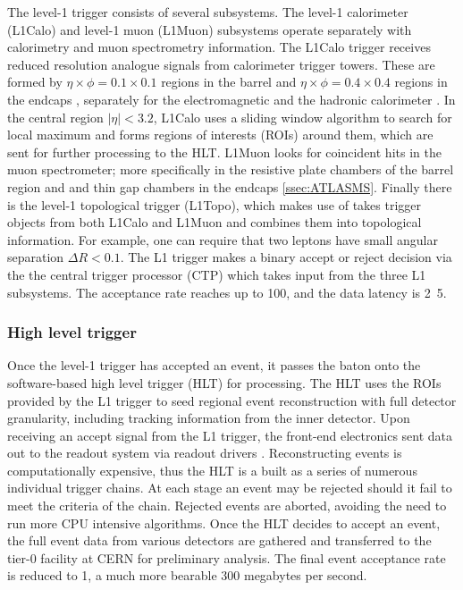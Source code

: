 The level-1 trigger consists of several subsystems. The level-1 calorimeter (L1Calo) and level-1 muon (L1Muon) subsystems operate separately with calorimetry and muon spectrometry information. The L1Calo trigger receives reduced resolution analogue signals from calorimeter trigger towers. These are formed by $\eta\times\phi=0.1\times0.1$ regions in the barrel and $\eta\times\phi=0.4\times0.4$ regions in the endcaps \cite{?}, separately for the electromagnetic and the hadronic calorimeter \cite{Aad:2716326}. In the central region $|\eta| < 3.2$, L1Calo uses a sliding window algorithm to search for local maximum and forms regions of interests (ROIs) around them, which are sent for further processing to the HLT. L1Muon looks for coincident hits in the muon spectrometer; more specifically in the resistive plate chambers of the barrel region and and thin gap chambers in the endcaps \ref{ssec:ATLASMS}. Finally there is the level-1 topological trigger (L1Topo), which makes use of takes trigger objects from both L1Calo and L1Muon and combines them into topological information. For example, one can require that two leptons have small angular separation $\Delta R < 0.1$. The L1 trigger makes a binary accept or reject decision via the the central trigger processor (CTP) which takes input from the three L1 subsystems. The acceptance rate reaches up to \unit{100}{\kilo\hertz}, and the data latency is \unit{2.5}{\micro\second}. 

\subsubsection{High level trigger}

Once the level-1 trigger has accepted an event, it passes the baton onto the software-based high level trigger (HLT) for processing. The HLT uses the ROIs provided by the L1 trigger to seed regional event reconstruction with full detector granularity, including tracking information from the inner detector. Upon receiving an accept signal from the L1 trigger, the front-end electronics sent data out to the readout system via readout drivers . Reconstructing events is computationally expensive, thus the HLT is a built as a series of numerous individual trigger chains. At each stage an event may be rejected should it fail to meet the criteria of the chain. Rejected events are aborted, avoiding the need to run more CPU intensive algorithms. Once the HLT decides to accept an event, the full event data from various detectors are gathered and transferred to the tier-0 facility at CERN for preliminary analysis. The final event acceptance rate is reduced to \unit{1}{\kilo\hertz}, a much more bearable 300 megabytes per second. 

